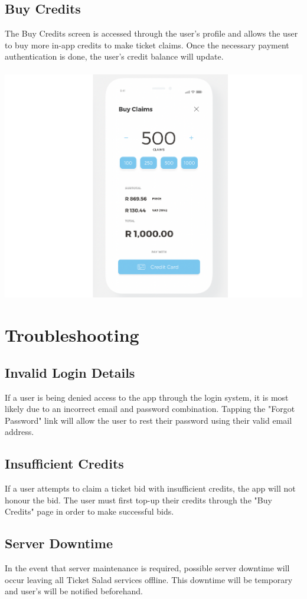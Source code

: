 \documentclass[11pt]{article}
\begin{document}
	\subsection{Buy Credits}
	The Buy Credits screen is accessed through the user's profile and allows the user to buy more in-app credits
	to make ticket claims. Once the necessary payment authentication is done, the user's credit balance will 		update.
	\\
	\\
	\includegraphics[width=\linewidth]{buy.png}
	\section{Troubleshooting}
	\subsection{Invalid Login Details}
	If a user is being denied access to the app through the login system, it is most likely due to an incorrect
	email and password combination. Tapping the "Forgot Password" link will allow the user to rest their password using their valid email address.
	\subsection{Insufficient Credits}
	If a user attempts to claim a ticket bid with insufficient credits, the app will not honour the bid. The user 
	must first top-up their credits through the "Buy Credits" page in order to make successful bids.
	\subsection{Server Downtime}
	In the event that server maintenance is required, possible server downtime will occur leaving all Ticket Salad 
	services offline. This downtime will be temporary and user's will be notified beforehand.
	
\end{document}
